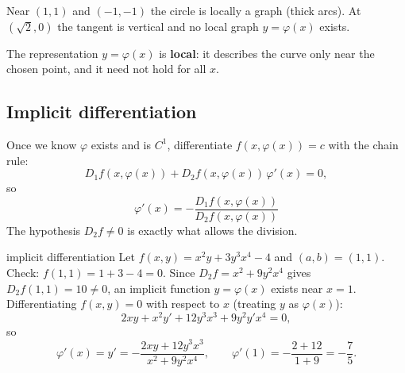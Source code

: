 \begin{center}

{\small\color{navy} Near $(1,1)$ and $(-1,-1)$ the circle is locally a graph (thick arcs). At
$(\sqrt2,0)$ the tangent is vertical and no local graph $y=\varphi(x)$ exists.}
\end{center}

\begin{keyidea}
The representation $y=\varphi(x)$ is \textbf{local}: it describes the curve only near the chosen
point, and it need not hold for all $x$.
\end{keyidea}

\subsection{Implicit differentiation}

\begin{extra}
Once we know $\varphi$ exists and is $C^1$, differentiate $f(x,\varphi(x))=c$ with the chain rule:
\[ D_1f(x,\varphi(x))+D_2f(x,\varphi(x))\,\varphi'(x)=0, \]
so
\[ \boxed{\,\varphi'(x)=-\frac{D_1f(x,\varphi(x))}{D_2f(x,\varphi(x))}\,} \]
The hypothesis $D_2f\neq0$ is exactly what allows the division.
\end{extra}

\begin{example}{implicit differentiation}
Let $f(x,y)=x^2y+3y^3x^4-4$ and $(a,b)=(1,1)$. Check: $f(1,1)=1+3-4=0$. Since
$D_2f=x^2+9y^2x^4$ gives $D_2f(1,1)=10\neq0$, an implicit function $y=\varphi(x)$ exists near $x=1$.
Differentiating $f(x,y)=0$ with respect to $x$ (treating $y$ as $\varphi(x)$):
\[ 2xy+x^2y'+12y^3x^3+9y^2y'x^4=0, \]
so
\[ \varphi'(x)=y'=-\frac{2xy+12y^3x^3}{x^2+9y^2x^4},\qquad \varphi'(1)=-\frac{2+12}{1+9}=-\frac75 . \]
\end{example}

